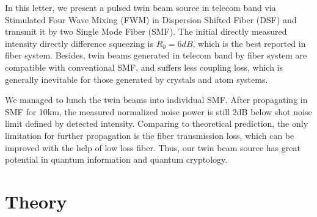 \documentclass[9pt,twocolumn,twoside]{osajnl}
\begin{document}


In this letter, we present a pulsed twin beam source in telecom band via Stimulated Four Wave Mixing (FWM) in Dispersion Shifted Fiber (DSF) and transmit it by two Single Mode Fiber (SMF). The initial directly measured intensity directly difference squeezing is $R_{0}= 6 dB$, which is the best reported in fiber system. Besides, twin beams generated in telecom band by fiber system are compatible with conventional SMF, and suffers less coupling loss, which is generally inevitable for those generated by crystals and atom systems.%

We managed to lunch the twin beams into individual SMF.
After propagating in SMF for 10km, the measured normalized noise power is still 2dB below shot noise limit defined by detected intensity. Comparing to theoretical prediction, the only limitation for further propagation is the fiber transmission loss, which can be improved with the help of low loss fiber. Thus, our twin beam source has great potential in quantum information and quantum cryptology.

\section{Theory}
\end{document}
